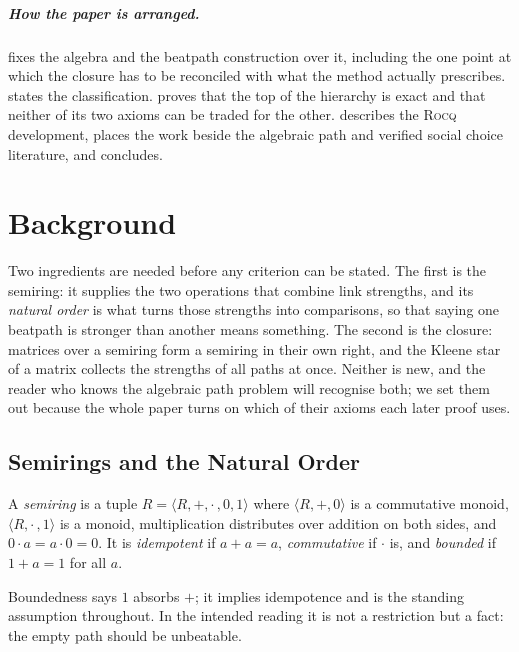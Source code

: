 \documentclass[a4paper,UKenglish,cleveref,autoref,thm-restate,anonymous]{lipics-v2021}
\newcommand{\rocq}{\textsc{Rocq}}
\begin{document}
\subparagraph*{How the paper is arranged.}
 fixes the algebra and  the beatpath
construction over it, including the one point at which the closure has to
be reconciled with what the method actually prescribes.
 states the classification.
 proves that the top of the hierarchy is exact
and that neither of its two axioms can be traded for the other.
 describes the \rocq{} development,
 places the work beside the algebraic path and verified
social choice literature, and  concludes.

\section{Background}\label{sec:prelim}

Two ingredients are needed before any criterion can be stated. The first
is the semiring: it supplies the two operations that combine link
strengths, and its \emph{natural order} is what turns those strengths into
comparisons, so that saying one beatpath is stronger than another means
something. The second is the closure: matrices over a semiring form a
semiring in their own right, and the Kleene star of a matrix collects the
strengths of all paths at once. Neither is new, and the reader who knows
the algebraic path problem will recognise both; we set them out because
the whole paper turns on which of their axioms each later proof uses.

\subsection{Semirings and the Natural Order}

\begin{definition}[Semiring]
A \emph{semiring} is a tuple $R = \langle R, +, \cdot\,, 0, 1\rangle$ where
$\langle R,+,0\rangle$ is a commutative monoid, $\langle R,\cdot\,,1\rangle$ is
a monoid, multiplication distributes over addition on both sides, and
$0\cdot a = a \cdot 0 = 0$. It is \emph{idempotent} if $a+a=a$,
\emph{commutative} if $\cdot$ is, and \emph{bounded} if $1 + a = 1$ for all
$a$.
\end{definition}

Boundedness says $1$ absorbs $+$; it implies idempotence and is the standing
assumption throughout. In the intended reading it is not a restriction but a
fact: the empty path should be unbeatable.
\end{document}
